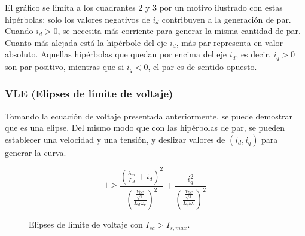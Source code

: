 El gráfico se limita a los cuadrantes 2 y 3 por un motivo ilustrado con estas hipérbolas: solo los valores negativos de \(i_d\) contribuyen a la generación de par. Cuando \(i_d>0\), se necesita más corriente para generar la misma cantidad de par. Cuanto más alejada está la hipérbole del eje \(i_d\), más par representa en valor absoluto. Aquellas hipérbolas que quedan por encima del eje \(i_d\), es decir, \(i_q > 0\) son par positivo, mientras que si \(i_q < 0\), el par es de sentido opuesto.

\subsubsection{VLE (Elipses de límite de voltaje)}

Tomando la ecuación de voltaje presentada anteriormente, se puede demostrar que es una elipse. Del mismo modo que con las hipérbolas de par, se pueden establecer una velocidad y una tensión, y deslizar valores de \((i_d, i_q)\) para generar la curva.

\begin{equation}
1 \geq \frac{\left(\frac{\lambda_m}{L_d}+i_d\right)^2}{\left(\frac{\frac{V_{DC}}{\sqrt{3}}}{L_d\omega_e}\right)^2}+\frac{i_q^2}{\left(\frac{\frac{V_{DC}}{\sqrt{3}}}{L_q\omega_e}\right)^2}
\end{equation}




\begin{figure}[H]
  \centering
  \caption{Elipses de límite de voltaje con $I_{sc} > I_{s,max}$.}
\end{figure}


